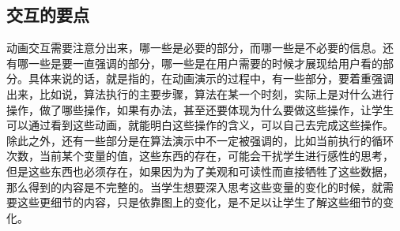\subsection{交互的要点}
动画交互需要注意分出来，哪一些是必要的部分，而哪一些是不必要的信息。还
有哪一些是要一直强调的部分，哪一些是在用户需要的时候才展现给用户看的部
分。具体来说的话，就是指的，在动画演示的过程中，有一些部分，要着重强调
出来，比如说，算法执行的主要步骤，算法在某一个时刻，实际上是对什么进行
操作，做了哪些操作，如果有办法，甚至还要体现为什么要做这些操作，让学生
可以通过看到这些动画，就能明白这些操作的含义，可以自己去完成这些操作。
除此之外，还有一些部分是在算法演示中不一定被强调的，比如当前执行的循环
次数，当前某个变量的值，这些东西的存在，可能会干扰学生进行感性的思考，
但是这些东西也必须存在，如果因为为了美观和可读性而直接牺牲了这些数据，
那么得到的内容是不完整的。当学生想要深入思考这些变量的变化的时候，就需
要这些更细节的内容，只是依靠图上的变化，是不足以让学生了解这些细节的变
化。
